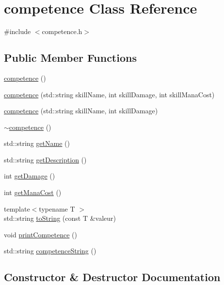\hypertarget{classcompetence}{}\section{competence Class Reference}
\label{classcompetence}


{\ttfamily \#include $<$competence.\+h$>$}

\subsection*{Public Member Functions}
\begin{DoxyCompactItemize}
\item 
\hyperlink{classcompetence_ae47bad4331015d873fef6b006b987d38}{competence} ()
\item 
\hyperlink{classcompetence_ae214635d91c8b1c5a37352dccbcd2397}{competence} (std\+::string skill\+Name, int skill\+Damage, int skill\+Mana\+Cost)
\item 
\hyperlink{classcompetence_a269947808c5e8662ecabb11e96a4d9c0}{competence} (std\+::string skill\+Name, int skill\+Damage)
\item 
\hyperlink{classcompetence_a158b19a476ae306eeaaa6672aab62e6c}{$\sim$competence} ()
\item 
std\+::string \hyperlink{classcompetence_abbb996751e239fc151caae2a73947710}{get\+Name} ()
\item 
std\+::string \hyperlink{classcompetence_ae0980a623fb74c32a630400cdb56cd14}{get\+Description} ()
\item 
int \hyperlink{classcompetence_a752380fae93494815023b3a177e57f44}{get\+Damage} ()
\item 
int \hyperlink{classcompetence_a8346c6ae95df148e42f26b9a94655c8f}{get\+Mana\+Cost} ()
\item 
{\footnotesize template$<$typename T $>$ }\\std\+::string \hyperlink{classcompetence_adbd67d184b75c46bc22c1aef070d9246}{to\+String} (const T \&valeur)
\item 
void \hyperlink{classcompetence_a5e486c7db01680742633e93c42a638b3}{print\+Competence} ()
\item 
std\+::string \hyperlink{classcompetence_a4acc4e02f7e8c49a6d4d1db307e8f03d}{competence\+String} ()
\end{DoxyCompactItemize}


\subsection{Constructor \& Destructor Documentation}
\mbox{\label{classcompetence_ae47bad4331015d873fef6b006b987d38}} 
